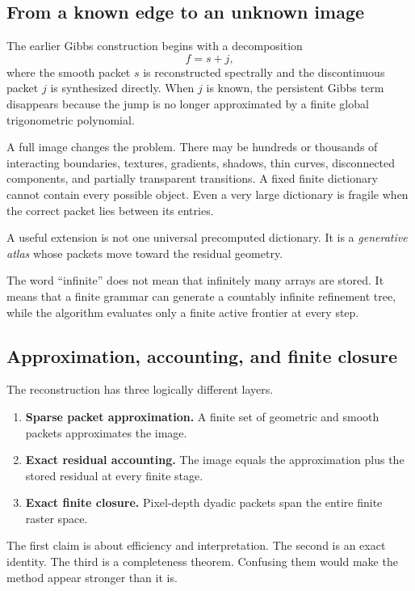\documentclass[11pt]{article}
\theoremstyle{definition}
\theoremstyle{remark}
\newcommand{\Callout}[2][PaleBlue]{\noindent\colorbox{#1}{\parbox{0.965\linewidth}{\vspace{3pt}#2\vspace{3pt}}}}
\begin{document}
\subsection{From a known edge to an unknown image}
The earlier Gibbs construction begins with a decomposition
\[
f=s+j,
\]
where the smooth packet $s$ is reconstructed spectrally and the discontinuous packet $j$ is synthesized directly. When $j$ is known, the persistent Gibbs term disappears because the jump is no longer approximated by a finite global trigonometric polynomial.

A full image changes the problem. There may be hundreds or thousands of interacting boundaries, textures, gradients, shadows, thin curves, disconnected components, and partially transparent transitions. A fixed finite dictionary cannot contain every possible object. Even a very large dictionary is fragile when the correct packet lies between its entries.

A useful extension is not one universal precomputed dictionary. It is a \emph{generative atlas} whose packets move toward the residual geometry.

\Callout[PaleOrange]{The word ``infinite'' does not mean that infinitely many arrays are stored. It means that a finite grammar can generate a countably infinite refinement tree, while the algorithm evaluates only a finite active frontier at every step.}

\FloatBarrier
\subsection{Approximation, accounting, and finite closure}
The reconstruction has three logically different layers.

\begin{enumerate}
\item \textbf{Sparse packet approximation.} A finite set of geometric and smooth packets approximates the image.
\item \textbf{Exact residual accounting.} The image equals the approximation plus the stored residual at every finite stage.
\item \textbf{Exact finite closure.} Pixel-depth dyadic packets span the entire finite raster space.
\end{enumerate}

The first claim is about efficiency and interpretation. The second is an exact identity. The third is a completeness theorem. Confusing them would make the method appear stronger than it is.
\end{document}
